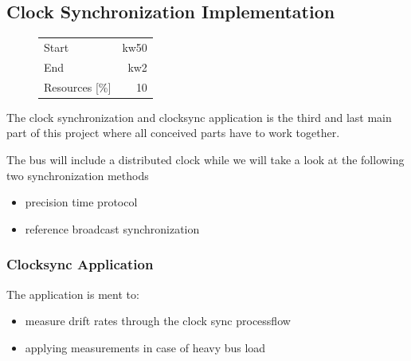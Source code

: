 \subsection{Clock Synchronization Implementation}
\begin{figure}
\begin{tabular}[t]{|lr|}
\hline
Start & kw50\\
End & kw2\\
Resources [\%] & 10\\
\hline
\end{tabular}
\end{figure}
The clock synchronization and clocksync application is the third and last main part of 
this project where all conceived parts have to work together.

The bus will include a distributed clock while we will 
take a look at the following two synchronization methods
\begin{itemize}
 \item precision time protocol
 \item reference broadcast synchronization
\end{itemize}

\subsubsection{Clocksync Application}
The application is ment to:
\begin{itemize}
 \item measure drift rates through the clock sync processflow
 \item applying measurements in case of heavy bus load
\end{itemize}

